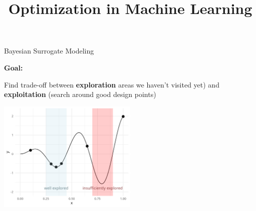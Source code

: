 \documentclass[11pt,compress,t,notes=noshow, xcolor=table]{beamer}
\title{Optimization in Machine Learning}
\date{}
\begin{document}


\begin{vbframe}{Bayesian Surrogate Modeling}

\textbf{Goal:}

Find trade-off between \textbf{exploration} areas we haven't visited yet) and \textbf{exploitation} (search around good design points)

\vspace{+.45cm}

\begin{center}
  \includegraphics[width = 0.5\textwidth]{figure_man/bayesian_loop_0.png}
\end{center}

\framebreak 


\end{vbframe}
\end{document}
